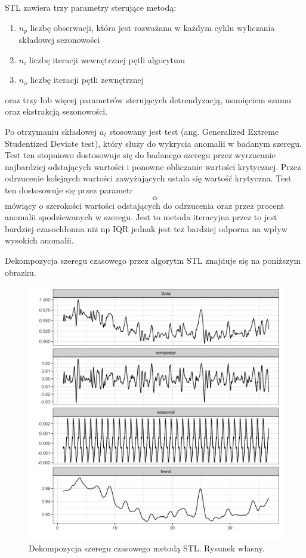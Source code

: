 STL zawiera trzy parametry sterujące metodą:

\begin{enumerate}
\def\labelenumi{\arabic{enumi}.}
\item
  \(n_{p}\) liczbę obserwacji, która jest rozważana w każdym cyklu
  wyliczania składowej sezonowości
\item
  \(n_{i}\) liczbę iteracji wewnętrznej pętli algorytmu
\item
  \(n_{o}\) liczbę iteracji pętli zewnętrznej
\end{enumerate}

oraz trzy lub więcej parametrów sterujących detrendyzacją, usunięciem
szumu oraz ekstrakcją sezonowości.

Po otrzymaniu składowej \(a_{t}\) stosowany jest test (ang. Generalized Extreme Studentized Deviate test), który służy do wykrycia anomalii w badanym szeregu. Test ten stopniowo dostosowuje się do badanego szeregu przez wyrzucanie najbardziej odstających wartości i ponowne obliczanie wartości krytycznej. Przez odrzucenie kolejnych wartości zawyżających  ustala się wartość krytyczna. Test ten dostosowuje się przez parametr \[\alpha\] mówiący o szerokości wartości odstających do odrzucenia oraz przez procent anomalii spodziewanych w szeregu. Jest to metoda iteracyjna przez to jest bardziej czasochłonna niż np IQR jednak jest też bardziej odporna na wpływ wysokich anomalii.   


Dekompozycja szeregu czasowego przez algorytm STL znajduje się na
poniższym obrazku.

\begin{figure}[H]
\centering
\includegraphics[width=\textwidth]{./images/stl-usage.png}
\caption{Dekompozycja szeregu czasowego metodą STL. Rysunek własny.}
\end{figure}

